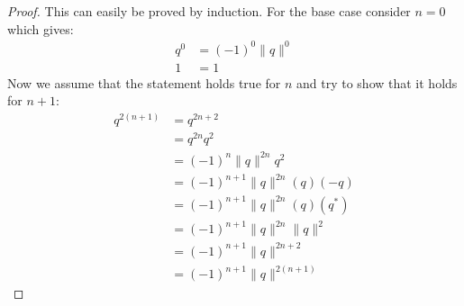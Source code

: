\documentclass[12pt, letterpaper, onecolumn, conference, final]{IEEEtran}
\theoremstyle{definition}
\newtheorem{proposition}{Proposition}
\theoremstyle{plain}
\begin{document}
\begin{proof}
This can easily be proved by induction. For the base case consider $n = 0$ which gives:
\begin{equation*}
\begin{split}
q^{0} &= (-1)^0 \| q \|^{0} \\
1 &= 1
\end{split}
\end{equation*}
Now we assume that the statement holds true for $n$ and try to show that it holds for $n+1$:
\begin{equation*}
\begin{split}
q^{2(n + 1)} &= q^{2n + 2} \\
&= q^{2n}q^2 \\
&= (-1)^n \| q \|^{2n}q^2 \\
&= (-1)^{n+1} \| q \|^{2n} (q)(-q) \\
&= (-1)^{n+1} \| q \|^{2n} (q)(q^*) \\
&= (-1)^{n+1} \| q \|^{2n} \| q \|^2 \\
&= (-1)^{n+1} \| q \|^{2n + 2} \\
&= (-1)^{n+1} \| q \|^{2(n + 1)}
\end{split}
\end{equation*}
\end{proof}

\begin{center}
\end{center}
\end{document}
